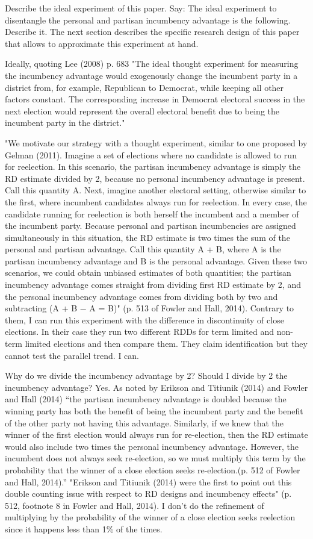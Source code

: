 \documentclass[12pt]{amsart}
\numberwithin{equation}{section}
\theoremstyle{definition}
\theoremstyle{definition}
\theoremstyle{definition}
\begin{document}
Describe the ideal experiment of this paper. Say: 
The ideal experiment to disentangle the personal and partisan incumbency advantage is the following. Describe it. The next section describes the specific research design of this paper that allows to approximate this experiment at hand. 

Ideally, quoting Lee (2008) p. 683 "The ideal thought experiment for measuring the incumbency advantage would exogenously change the incumbent party in a district from, for example, Republican to Democrat, while keeping all other factors constant. The corresponding increase in Democrat electoral success in the next election would represent the overall electoral benefit due to being the incumbent party in the district."

"We motivate our strategy with a thought experiment, similar to one proposed by Gelman (2011). Imagine a set of elections where no candidate is allowed to run for reelection. In this scenario, the partisan incumbency advantage is simply the RD estimate divided by 2, because no personal incumbency advantage is present. Call this quantity A. Next, imagine another electoral setting, otherwise similar to the first, where incumbent candidates always run for reelection. In every case, the candidate running for reelection is both herself the incumbent and a member of the incumbent party. Because personal and partisan incumbencies are assigned simultaneously in this situation, the RD estimate is two times the sum of the personal and partisan advantage. Call this quantity A + B, where A is the partisan incumbency advantage and B is the personal advantage. Given these two scenarios, we could obtain unbiased estimates of both quantities; the partisan incumbency advantage comes straight from dividing first RD estimate by 2, and the personal incumbency advantage comes from dividing both by two and subtracting (A + B − A = B)" (p. 513 of Fowler and Hall, 2014). Contrary to them, I can run this experiment with the difference in discontinuity of close elections. In their case they run two different RDDs for term limited and non-term limited elections and then compare them. They claim identification but they cannot test the parallel trend. I can.

Why do we divide the incumbency advantage by 2? Should I divide by 2 the incumbency advantage? Yes. As noted by Erikson and Titiunik (2014) and Fowler and Hall (2014) ``the partisan incumbency advantage is doubled because the winning party has both the benefit of being the incumbent party and the benefit of the other party not having this advantage. Similarly, if we knew that the winner of the first election would always run for re-election, then the RD estimate would also include two times the personal incumbency advantage. However, the incumbent does not always seek re-election, so we must multiply this term by the probability that the winner of a close election seeks re-election.(p. 512 of Fowler and Hall, 2014).'' "Erikson and Titiunik (2014) were the first to point out this double counting issue with respect to RD designs and incumbency effects" (p. 512, footnote 8 in Fowler and Hall, 2014). I don't do the refinement of multiplying by the probability of the winner of a close election seeks reelection since it happens less than 1\% of the times.
\end{document}

